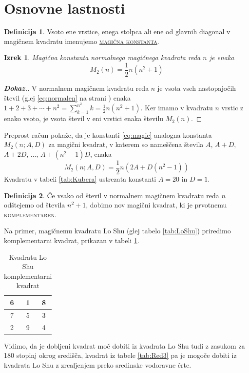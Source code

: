 \documentclass[a4paper,12pt]{article}
\newcommand{\pojem}[1]{\underline{\textsc{#1}}}
\theoremstyle{definition}
\newtheorem{definicija}{Definicija}
\theoremstyle{plain}
\newtheorem{izrek}{Izrek}
\newenvironment{dokaz}{
   \begin{proof}[\textnormal{\textbf{Dokaz.}}]%
}{      
   \end{proof}%
}
\newenvironment{magic}[3]{
   \begin{table}%
   \centering%
   \caption{#2}%
   \label{#3}%
   \large
   \begin{tabular}{|*{#1}{c|}}%
      \hline
}{
   \end{tabular}%
   \end{table}%
}
\begin{document}
\section{Osnovne lastnosti}
\begin{definicija}
   Vsoto ene vrstice, enega stolpca ali ene od glavnih diagonal
   v magičnem kvadratu imenujemo \pojem{magična konstanta}.
\end{definicija}
\begin{izrek}
   Magična konstanta normalnega magičnega kvadrata reda $n$
   je enaka
   \begin{equation}
      \label{eq:magic}
      M_2(n) = \frac{1}{2} n(n^2 + 1)
   \end{equation}
\end{izrek}
\begin{dokaz}
   V normalnem magičnem kvadratu reda $n$ je vsota vseh nastopajočih
   števil (glej \eqref{eq:normalen} na strani \pageref{eq:normalen}) enaka
   $1 + 2 + 3 + \cdots + n^2 = \sum_{k=1}^{n^2}k = \frac{1}{2} n(n^2 + 1)$. Ker imamo
   v kvadratu $n$ vrstic z enako vsoto, je vsota števil v eni vrstici
   enaka številu $M_2(n)$.
\end{dokaz}
Preprost račun pokaže, da je konstanti \eqref{eq:magic} analogna konstanta
$M_2(n; A, D)$ za magični kvadrat, v katerem so nameščena števila
$A$, $A + D$, $A + 2D$, $\dots$, $A + (n^2 - 1)D$, enaka
\begin{equation*}
   M_2(n; A, D) = \frac{1}{2} n(2A + D(n^2 - 1))
\end{equation*}
Kvadratu v tabeli \ref{tab:Kubera} ustrezata konstanti $A = 20$ in $D = 1$.
\begin{definicija}
   Če vsako od števil v normalnem magičnem kvadratu reda $n$ odštejemo
   od števila $n^2 + 1$, dobimo nov magični kvadrat, ki je prvotnemu
   \pojem{komplementaren}.
\end{definicija}
Na primer, magičnemu kvadratu Lo Shu (glej tabelo \ref{tab:LoShu}) priredimo
komplementarni kvadrat, prikazan v tabeli \ref{tab:Komplement}.
\begin{magic}{3}{Kvadratu Lo Shu komplementarni kvadrat}{tab:Komplement}
   6 & 1 & 8 \\\hline
   7 & 5 & 3 \\\hline
   2 & 9 & 4 \\\hline
\end{magic}
Vidimo, da je dobljeni kvadrat moč dobiti iz kvadrata Lo Shu tudi z zasukom za
180 stopinj okrog središča, kvadrat iz tabele \ref{tab:Red3} pa je mogoče dobiti
iz kvadrata Lo Shu z zrcaljenjem preko sredinske vodoravne črte.
\end{document}
